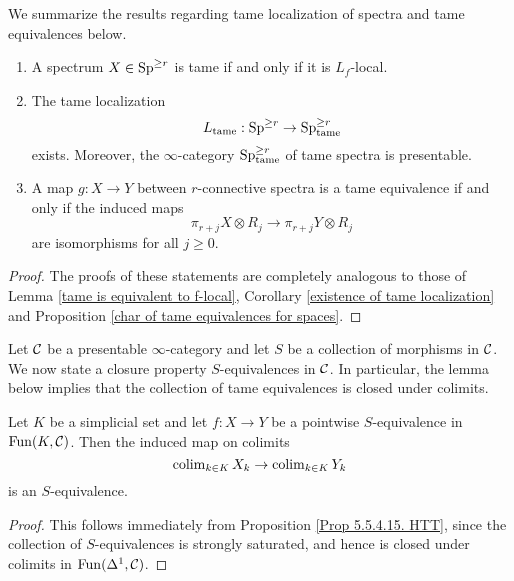 We
summarize the results regarding tame localization of spectra and tame equivalences below. 

\begin{proposition}
        \begin{enumerate}
            \item A spectrum $X\in \operatorname{Sp}^{\geq r}$ is tame if and only if it is $L_f$-local.
            \item The tame localization
$$
L_{\operatorname{\operatorname{tame}}}: \operatorname{Sp}^{\geq r} \to \operatorname{Sp}^{\geq r}_{\operatorname{\operatorname{tame}}}
$$
exists. Moreover, the $\infty$-category $\operatorname{Sp}^{\geq r}_{\operatorname{\operatorname{tame}}}$ of tame spectra is presentable.
\item  A map $g: X\to Y$ between $r$-connective spectra is a tame equivalence if and only if the induced maps
        $$
        \pi_{r+j}X \otimes R_{j} 
        \to
        \pi_{r+j}Y \otimes R_{j}
        $$
        are isomorphisms for all $j\geq 0$.
        \end{enumerate}
\end{proposition}
\begin{proof}
    The proofs of these statements are completely analogous to those of Lemma \ref{tame is equivalent to f-local}, Corollary \ref{existence of tame localization} and Proposition \ref{char of tame equivalences for spaces}.
    
\end{proof}

Let ${\mathcal{C}}$ be a presentable $\infty$-category and let $S$ be a collection of morphisms in ${\mathcal{C}}$.
We now state a closure property $S$-equivalences in ${\mathcal{C}}$. In particular, the lemma below implies that the collection of tame equivalences is closed under colimits.
\begin{lemma}
\label{closure property of tame equivalences}
		Let $K$ be a simplicial set and
		let $f:X\to Y$ be a pointwise $S$-equivalence in $\operatorname{Fun}(K,{\mathcal{C}})$.
	Then the induced map on colimits 
		$$
		\operatorname{colim}_{k\in K}X_k \to \operatorname{colim}_{k\in K}Y_k
		$$ is an $S$-equivalence.
		
\end{lemma}
\begin{proof}
    This follows immediately from Proposition \ref{Prop 5.5.4.15. HTT}, since the collection of $S$-equivalences is strongly saturated, and hence is closed under colimits in $\operatorname{Fun}(\Delta^1, {\mathcal{C}})$.
\end{proof}

